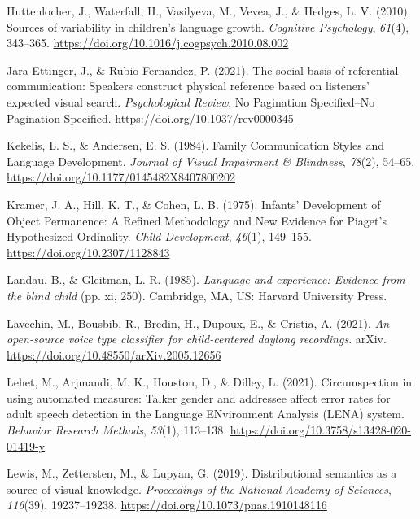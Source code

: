 \documentclass[
  man]{apa6}
\newlength{\cslhangindent}
\newlength{\cslentryspacingunit} %
\newenvironment{CSLReferences}[2] %
 {%
  \setlength{\parindent}{0pt}
  \ifodd #1
  \let\oldpar\par
  \def\par{\hangindent=\cslhangindent\oldpar}
  \fi
  \setlength{\parskip}{#2\cslentryspacingunit}
 }%
 {}
\begin{document}
\begin{CSLReferences}{1}{0}
\leavevmode{}%
Huttenlocher, J., Waterfall, H., Vasilyeva, M., Vevea, J., \& Hedges, L. V. (2010). Sources of variability in children's language growth. \emph{Cognitive Psychology}, \emph{61}(4), 343--365. \url{https://doi.org/10.1016/j.cogpsych.2010.08.002}

\leavevmode{}%
Jara-Ettinger, J., \& Rubio-Fernandez, P. (2021). The social basis of referential communication: {Speakers} construct physical reference based on listeners' expected visual search. \emph{Psychological Review}, No Pagination Specified--No Pagination Specified. \url{https://doi.org/10.1037/rev0000345}

\leavevmode{}%
Kekelis, L. S., \& Andersen, E. S. (1984). Family {Communication Styles} and {Language Development}. \emph{Journal of Visual Impairment \& Blindness}, \emph{78}(2), 54--65. \url{https://doi.org/10.1177/0145482X8407800202}

\leavevmode{}%
Kramer, J. A., Hill, K. T., \& Cohen, L. B. (1975). Infants' {Development} of {Object Permanence}: {A Refined Methodology} and {New Evidence} for {Piaget}'s {Hypothesized Ordinality}. \emph{Child Development}, \emph{46}(1), 149--155. \url{https://doi.org/10.2307/1128843}

\leavevmode{}%
Landau, B., \& Gleitman, L. R. (1985). \emph{Language and experience: {Evidence} from the blind child} (pp. xi, 250). Cambridge, MA, US: Harvard University Press.

\leavevmode{}%
Lavechin, M., Bousbib, R., Bredin, H., Dupoux, E., \& Cristia, A. (2021). \emph{An open-source voice type classifier for child-centered daylong recordings}. arXiv. \url{https://doi.org/10.48550/arXiv.2005.12656}

\leavevmode{}%
Lehet, M., Arjmandi, M. K., Houston, D., \& Dilley, L. (2021). Circumspection in using automated measures: {Talker} gender and addressee affect error rates for adult speech detection in the {Language ENvironment Analysis} ({LENA}) system. \emph{Behavior Research Methods}, \emph{53}(1), 113--138. \url{https://doi.org/10.3758/s13428-020-01419-y}

\leavevmode{}%
Lewis, M., Zettersten, M., \& Lupyan, G. (2019). Distributional semantics as a source of visual knowledge. \emph{Proceedings of the National Academy of Sciences}, \emph{116}(39), 19237--19238. \url{https://doi.org/10.1073/pnas.1910148116}


\end{CSLReferences}
\end{document}
